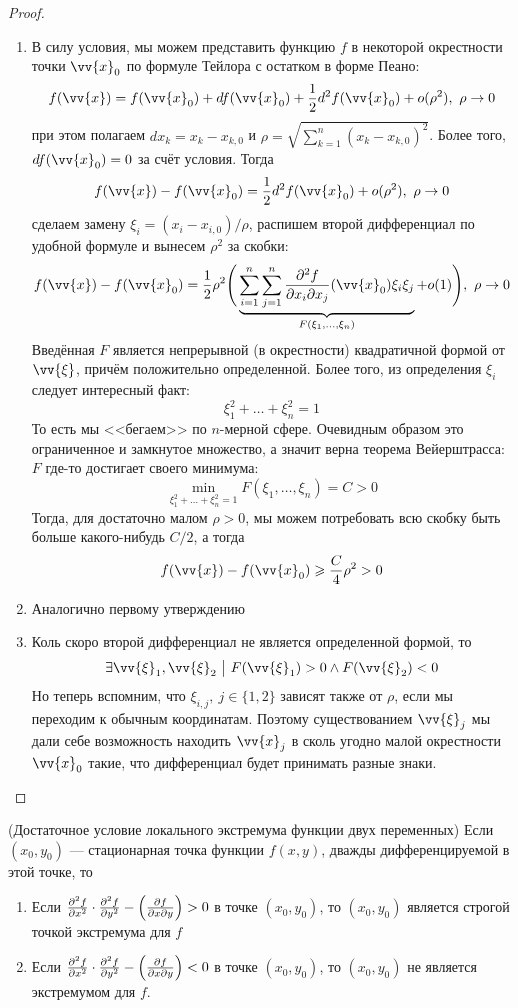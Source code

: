 \begin{proof}~
	\begin{enumerate}
		\item В силу условия, мы можем представить функцию $f$ в некоторой окрестности точки $\vv{x}_0$ по формуле Тейлора с остатком в форме Пеано:
		\[
			f(\vv{x}) = f(\vv{x}_0) + df(\vv{x}_0) + \frac{1}{2}d^2f(\vv{x}_0) + o(\rho^2),\ \rho \to 0
		\]
		при этом полагаем $dx_k = x_k - x_{k, 0}$ и $\rho = \sqrt{\sum_{k = 1}^n (x_k - x_{k, 0})^2}$. Более того, $df(\vv{x}_0) = 0$ за счёт условия. Тогда
		\[
			f(\vv{x}) - f(\vv{x}_0) = \frac{1}{2} d^2f(\vv{x}_0) + o(\rho^2),\ \rho \to 0
		\]
		сделаем замену $\xi_i = (x_i - x_{i, 0}) / \rho$, распишем второй дифференциал по удобной формуле и вынесем $\rho^2$ за скобки:
		\[
			f(\vv{x}) - f(\vv{x}_0) = \frac{1}{2}\rho^2 \Bigg(\underbrace{\sum_{i = 1}^n \sum_{j = 1}^n \pd{^2 f}{x_i \vdelta x_j} (\vv{x}_0) \xi_i \xi_j}_{F(\xi_1, \ldots, \xi_n)} + o(1)\Bigg),\ \rho \to 0
		\]
		Введённая $F$ является непрерывной (в окрестности) квадратичной формой от $\vv{\xi}$, причём положительно определенной. Более того, из определения $\xi_i$ следует интересный факт:
		\[
			\xi_1^2 + \ldots + \xi_n^2 = 1
		\]
		То есть мы <<бегаем>> по $n$-мерной сфере. Очевидным образом это ограниченное и замкнутое множество, а значит верна теорема Вейерштрасса: $F$ где-то достигает своего минимума:
		\[
			\min_{\xi_1^2 + \ldots + \xi_n^2 = 1} F(\xi_1, \ldots, \xi_n) = C > 0
		\]
		Тогда, для достаточно малом $\rho > 0$, мы можем потребовать всю скобку быть больше какого-нибудь $C / 2$, а тогда
		\[
			f(\vv{x}) - f(\vv{x}_0) \ge \frac{C}{4} \rho^2 > 0
		\]
		
		\item Аналогично первому утверждению
		
		\item Коль скоро второй дифференциал не является определенной формой, то
		\[
			\exists \vv{\xi}_1, \vv{\xi}_2 \such F(\vv{\xi}_1) > 0 \wedge F(\vv{\xi}_2) < 0
		\]
		Но теперь вспомним, что $\xi_{i, j},\ j \in \{1, 2\}$ зависят также от $\rho$, если мы переходим к обычным координатам. Поэтому существованием $\vv{\xi}_j$ мы дали себе возможность находить $\vv{x}_j$ в сколь угодно малой окрестности $\vv{x}_0$ такие, что дифференциал будет принимать разные знаки.
	\end{enumerate}
\end{proof}

\begin{corollary} (Достаточное условие локального экстремума функции двух переменных)
	Если $(x_0, y_0)$ --- стационарная точка функции $f(x, y)$, дважды дифференцируемой в этой точке, то
	\begin{enumerate}
		\item Если $\frac{\partial ^2 f}{\partial x^2} \cdot \frac{\partial ^2 f}{\partial y^2} - \left(\frac{\partial f}{\partial x \partial y}\right) > 0$ в точке $(x_0, y_0)$, то $(x_0, y_0)$ является строгой точкой экстремума для $f$
		
		\item Если $\frac{\partial ^2 f}{\partial x^2} \cdot \frac{\partial ^2 f}{\partial y^2} - \left(\frac{\partial f}{\partial x \partial y}\right) < 0$ в точке $(x_0, y_0)$, то $(x_0, y_0)$ не является экстремумом для $f$.
	\end{enumerate}
\end{corollary}

